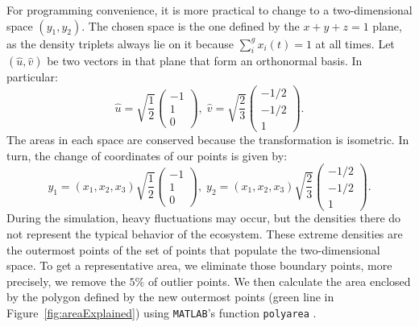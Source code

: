 For programming convenience, it is more practical to change to a two-dimensional space $(y_1,y_2)$. The chosen space is the one defined by the $x +y +z = 1$  plane, as the density triplets always lie on it because $\sum_{i}^{g} x_i(t) = 1$ at all times. Let $(\hat{u},\hat{v})$ be two vectors in that plane that form an orthonormal basis. In particular:
\begin{equation}
    \hat{u} = \sqrt{\frac{1}{2}} \begin{pmatrix}
           -1 \\
           1 \\
           0
         \end{pmatrix} , \;
    \hat{v} = \sqrt{\frac{2}{3}} \begin{pmatrix}
           -1/2 \\
           -1/2 \\
           1
         \end{pmatrix}.
\end{equation}
The areas in each space are conserved because the transformation is isometric. In turn, the change of coordinates of our points is given by:
\begin{equation}
    y_1 = (x_1,x_2,x_3)\sqrt{\frac{1}{2}} \begin{pmatrix}
           -1 \\
           1 \\
           0
         \end{pmatrix} , \;
     y_2 = (x_1,x_2,x_3)\sqrt{\frac{2}{3}} \begin{pmatrix}
           -1/2 \\
           -1/2 \\
           1
         \end{pmatrix}.
\end{equation}
During the simulation, heavy fluctuations may occur, but the densities there do not represent the typical behavior of the ecosystem. These extreme densities are the outermost points of the set of points that populate the two-dimensional space. To get a representative area, we eliminate those boundary points, more precisely, we remove the $5\%$ of outlier points. We then calculate the area enclosed by the polygon defined by the new outermost points (green line in Figure~\ref{fig:areaExplained}) using \texttt{MATLAB}'s function  \texttt{polyarea} \cite{polyarea}.

